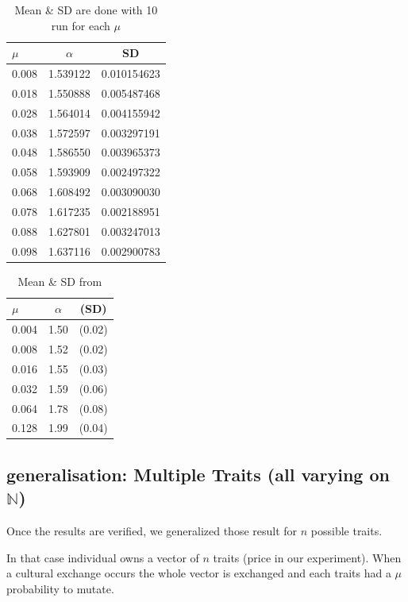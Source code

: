\documentclass[a4paper]{article}
\begin{document}
\begin{table}
	\centering
	\begin{tabular}{l|cc}
			$\mu$ & $\alpha$ & SD\\\hline
			0.008&1.539122&0.010154623\\
			0.018&1.550888&0.005487468\\
			0.028&1.564014&0.004155942\\
			0.038&1.572597&0.003297191\\
			0.048&1.586550&0.003965373\\
			0.058&1.593909&0.002497322\\
			0.068&1.608492&0.003090030\\
			0.078&1.617235&0.002188951\\
			0.088&1.627801&0.003247013\\
			0.098&1.637116&0.002900783\\
	\end{tabular}
	\caption{Mean \& SD are done with 10 run for each $\mu$}
	\label{tab:mualpha}
\end{table}







\begin{table}
	\centering
	\begin{tabular}{l|cc}
$\mu$&$\alpha$&(SD)\\\hline
0.004&1.50&(0.02) \\
0.008&1.52&(0.02)\\
0.016&1.55&(0.03)\\
0.032&1.59&(0.06)\\
0.064&1.78&(0.08)\\
0.128&1.99&(0.04)\\
	\end{tabular}
	\caption{Mean \& SD from \cite{bentley2004randomdriftandculturechange} }
	\label{tab:Bmualpha}
\end{table}







\subsection{generalisation: Multiple Traits (all varying on $\mathbb{N}$)}
Once the results are verified, we generalized those result for $n$ possible traits.

In that case individual owns a vector of $n$ traits (price in our experiment). When a cultural exchange occurs the whole vector is exchanged and each traits  had a $\mu$ probability to mutate.
\end{document}
